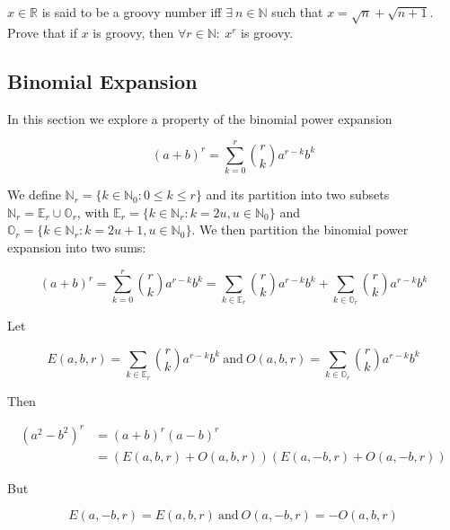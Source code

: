 \vspace{10 mm}
\begin{problem}
$x \in \mathbb{R}$ is said to be a groovy number iff $\exists\  n \in \mathbb{N}$ such that $x = \sqrt{n} + \sqrt{n + 1}$. Prove that if $x$ is groovy, then $\forall r \in \mathbb{N}:\ x^r$ is groovy.
\end{problem}

\subsection{Binomial Expansion}

In this section we explore a property of the binomial power expansion

\begin{equation*}
(a + b)^r = \sum_{k = 0}^r \binom{r}{k} a^{r - k} b^k
\end{equation*}

\noindent We define $\mathbb{N}_r = \{k \in \mathbb{N}_0: 0 \leq k \leq r\}$ and its partition into two subsets \mbox{$\mathbb{N}_r = \mathbb{E}_r \cup \mathbb{O}_r$}, with  \mbox{$\mathbb{E}_r = \{k \in \mathbb{N}_r: k = 2 u, u \in \mathbb{N}_0 \}$} and \\
\mbox{$\mathbb{O}_r = \{k \in \mathbb{N}_r: k  = 2 u + 1, u \in \mathbb{N}_0 \}$}. We then partition the binomial power expansion into two sums:

\begin{equation*}
(a + b)^r = \sum_{k = 0}^r \binom{r}{k} a^{r - k} b^k = \sum_{k \in \mathbb{E}_r}  \binom{r}{k} a^{r - k} b^k + \sum_{k \in \mathbb{O}_r}  \binom{r}{k} a^{r - k} b^k
\end{equation*}

\noindent Let 

\begin{equation*}
E(a, b, r) = \sum_{k \in \mathbb{E}_r}  \binom{r}{k} a^{r - k} b^k \ \text{and} \ O(a, b, r) = \sum_{k \in \mathbb{O}_r}  \binom{r}{k} a^{r - k} b^k
\end{equation*}
  
\noindent Then

\begin{align*}
(a^2 - b^2)^r &= (a + b)^r (a - b)^r \\
&= (E(a, b, r) + O(a, b, r)) (E(a, -b, r) + O(a, -b, r))
\end{align*}

\noindent But

\begin{equation*}
E(a, -b, r) = E(a, b, r) \ \text{and}\  O(a, -b, r) = - O(a, b, r) 
\end{equation*}

